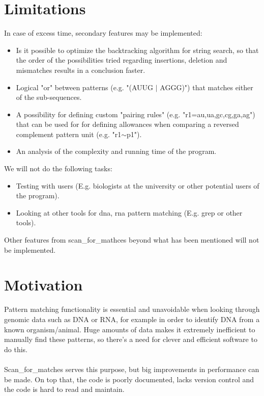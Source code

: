 \documentclass[12pt]{article}
\begin{document}
\section{Limitations}
\begin{flushleft}
In case of excess time, secondary features may be implemented: 
\end{flushleft}

\begin{itemize}
\item Is it possible to optimize the backtracking algorithm for string search, so that the order of the possibilities 
tried regarding insertions, deletion and mismatches results in a conclusion faster.
\item Logical "or" between patterns (e.g. "(AUUG $|$ AGGG)") that matches either of the sub-sequences.
\item A possibility for defining custom "pairing rules" (e.g. "r1={au,ua,gc,cg,ga,ag}") that can be used for 
for defining allowances when comparing a reversed complement pattern unit (e.g. "r1$\sim$p1").
\item An analysis of the complexity and running time of the program.
\end{itemize}
\begin{flushleft}
We will not do the following tasks:
\end{flushleft}

\begin{itemize}
	\item Testing with users (E.g. biologists at the university or other potential users of the program).
	\item Looking at other tools for dna, rna pattern matching (E.g. grep or other tools).
\end{itemize}
Other features from scan\_for\_mathces beyond what has been mentioned will not be implemented.


\section{Motivation}
Pattern matching functionality is essential and unavoidable when looking through genomic data such as DNA or RNA, 
for example in order to identify DNA from a known organism/animal.
Huge amounts of data makes it extremely inefficient to manually find these patterns, so there's a need for clever
and efficient software to do this. \\ \\
Scan\_for\_matches serves this purpose, but big improvements in performance can be made.
On top that, the code is poorly documented, lacks version control and the code is hard to read and maintain.
\end{document}
